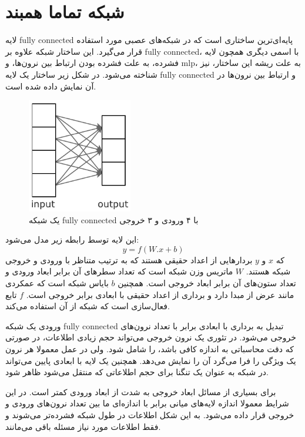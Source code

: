 \section{شبکه تماما همبند}
لایه \gls{fully connected} پایه‌ای‌ترین ساختاری است که در شبکه‌های عصبی مورد
استفاده قرار می‌گیرد. این ساختار شبکه علاوه بر \gls{fully connected}، با اسمی
دیگری همچون لایه فشرده، به علت فشرده بودن ارتباط بین نرون‌ها، و \gls{mlp}، به
علت ریشه این ساختار، نیز شناخته می‌شود. در شکل زیر ساختار یک لایه \gls{fully
connected} و ارتباط بین نرون‌ها در آن نمایش داده شده است.
\begin{figure}[ht]
    \centering
    \includegraphics[height=5cm]{./statics/fully_connected.png}
    \caption{یک شبکه \gls{fully connected} با ۴ ورودی و ۳ خروجی}
\end{figure}

این لایه توسط رابطه زیر مدل می‌شود:
\begin{equation}
    y = f(W.x + b)
\end{equation}
که $x$ و $y$ بردارهایی از اعداد حقیقی هستند که به ترتیب متناظر با ورودی و خروجی
شبکه هستند. $W$ ماتریس وزن شبکه است که تعداد سطرهای آن برابر ابعاد ورودی و تعداد
ستون‌های آن برابر ابعاد خروجی است. همچنین $b$ بایاس شبکه است که عمکردی مانند عرض
از مبدا دارد و برداری از اعداد حقیقی با ابعادی برابر خروجی است. $f$ تابع
فعال‌سازی است که شبکه از آن استفاده می‌کند.

ورودی یک شبکه \gls{fully connected} تبدیل به برداری با ابعادی برابر با تعداد
نرون‌های خروجی می‌شود. در تئوری یک نرون خروجی می‌تواند حجم زیادی اطلاعات، در
صورتی که دقت محاسباتی به اندازه کافی باشد، را شامل شود. ولی در عمل معمولا هر
نرون یک ویژگی را فرا می‌گرد آن را نمایش می‌دهد. همچنین یک لایه با ابعادی پایین
می‌تواند در شبکه به عنوان یک تنگنا برای حجم اطلاعاتی که منتقل می‌شود ظاهر شود.

برای بسیاری از مسائل ابعاد خروجی به شدت از ابعاد ورودی کمتر است. در این شرایط
معمولا اندازه لایه‌های میانی برابر با اندازه‌ای ما بین تعداد نرون‌های ورودی و
خروجی قرار داده می‌شود. به این شکل اطلاعات در طول شبکه فشرده‌تر می‌شوند و فقط
اطلاعات مورد نیاز مسئله باقی می‌مانند.

